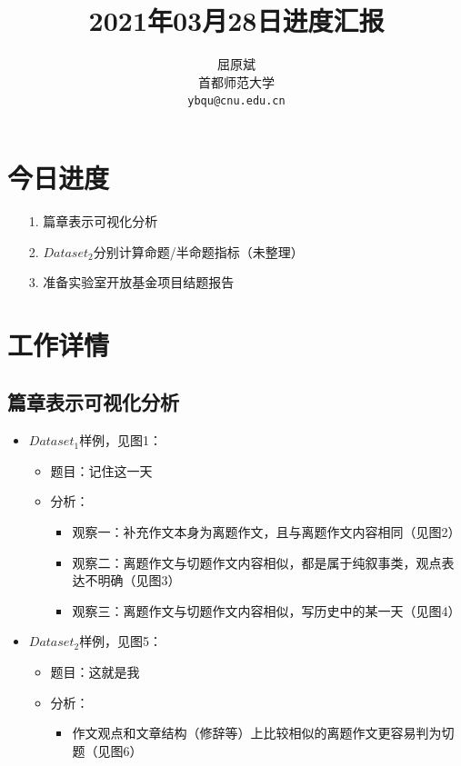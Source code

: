 \documentclass[11pt]{article}
\title{2021年03月28日进度汇报}
\author{屈原斌 \\
  首都师范大学 \\
    {\tt ybqu@cnu.edu.cn}}
\date{}
\begin{document}
\begin{CJK}{UTF8}{gkai}

\maketitle
\CJKindent


\section{今日进度}


\begin{itemize}
\item [1.] 篇章表示可视化分析
\item [2.] $Dataset_2$分别计算命题/半命题指标（未整理）
\item [3.] 准备实验室开放基金项目结题报告
\end{itemize}

\section{工作详情}

\subsection{篇章表示可视化分析}
\begin{itemize}
  \item $Dataset_1$样例，见图1：
  \begin{itemize}
    \item 题目：记住这一天
    \item 分析：
    \begin{itemize}
      \item 观察一：补充作文本身为离题作文，且与离题作文内容相同（见图2）
      \item 观察二：离题作文与切题作文内容相似，都是属于纯叙事类，观点表达不明确（见图3）
      \item 观察三：离题作文与切题作文内容相似，写历史中的某一天（见图4）
    \end{itemize}
  \end{itemize}
  \item $Dataset_2$样例，见图5：
  \begin{itemize}
    \item 题目：这就是我
    \item 分析：
    \begin{itemize}
      \item 作文观点和文章结构（修辞等）上比较相似的离题作文更容易判为切题（见图6）
    \end{itemize}
  \end{itemize}
\end{itemize}


\end{CJK}
\end{document}
